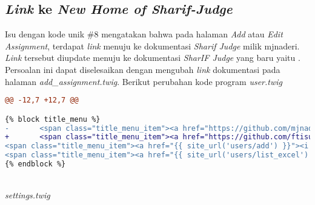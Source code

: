 	\subsection{\textit{Link} ke \textit{New Home of Sharif-Judge}}
	Isu dengan kode unik \#8 mengatakan bahwa pada halaman \textit{Add} atau \textit{Edit Assignment}, terdapat \textit{link} menuju ke dokumentasi \textit{Sharif Judge} milik mjnaderi. \textit{Link} tersebut diupdate menuju ke dokumentasi \textit{SharIF Judge} yang baru yaitu . Persoalan ini dapat diselesaikan dengan mengubah \textit{link} dokumentasi pada halaman \textit{add\_assignment.twig}. Berikut perubahan kode program
	\textit{user.twig}
\begin{lstlisting}[language=diff, basicstyle=\ttfamily, frame=single,
columns=fullflexible, keepspaces=true, breaklines=true]
@@ -12,7 +12,7 @@

{% block title_menu %}
-       <span class="title_menu_item"><a href="https://github.com/mjnaderi/Sharif-Judge/blob/docs/v1.4/users.md" target="_blank"><i class="fa fa-question-circle color6"></i> Help</a></span>
+       <span class="title_menu_item"><a href="https://github.com/ftisunpar/Sharif-Judge/blob/docs/v1.4/users.md" target="_blank"><i class="fa fa-question-circle color6"></i> Help</a></span>
<span class="title_menu_item"><a href="{{ site_url('users/add') }}"><i class="fa fa-plus color11"></i> Add Users</a></span>
<span class="title_menu_item"><a href="{{ site_url('users/list_excel') }}"><i class="fa fa-download color9"></i> Excel</a></span>
{% endblock %}
\end{lstlisting}
~\\	
	\textit{settings.twig}
